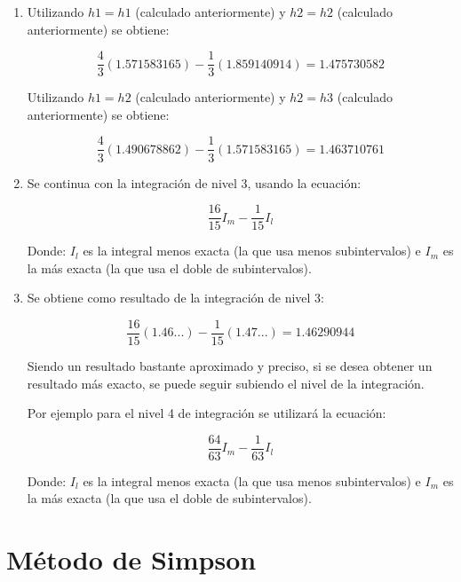 \documentclass[journal,transmag]{IEEEtran}
\theoremstyle{mytheoremstyle}
\theoremstyle{mytheoremstyle}
\theoremstyle{myproblemstyle}
\begin{document}
\begin{enumerate}
    \item   Utilizando $h1 = h1$ (calculado anteriormente) y $h2 = h2$ (calculado anteriormente) se obtiene:
    \begin{center}
    \begin{equation}
        \frac{4}{3}(1.571583165)-\frac{1}{3}(1.859140914) = 1.475730582
    \end{equation}
    \end{center}
    Utilizando $h1 = h2$ (calculado anteriormente) y $h2 = h3$ (calculado anteriormente) se obtiene:
    \begin{center}
    \begin{equation}
        \frac{4}{3}(1.490678862)-\frac{1}{3}(1.571583165) = 1.463710761
    \end{equation}
    \end{center}
    \item   Se continua con la integración de nivel 3, usando la ecuación:
    \begin{center}
    \begin{equation}
        \frac{16}{15}I_m-\frac{1}{15}I_l
    \end{equation}
    \end{center}
    Donde: $I_l$ es la integral menos exacta (la que usa menos subintervalos) e $I_m$ es la más exacta (la que usa el doble de subintervalos).
    \item   Se obtiene como resultado de la integración de nivel 3:
    \begin{center}
    \begin{equation}
        \frac{16}{15}(1.46...)-\frac{1}{15}(1.47...) = 1.46290944
    \end{equation}
    \end{center}
    Siendo un resultado bastante aproximado y preciso, si se desea obtener un resultado más exacto, se puede seguir subiendo el nivel de la integración.

    Por ejemplo para el nivel 4 de integración se utilizará la ecuación:
    \begin{center}
    \begin{equation}
        \frac{64}{63}I_m-\frac{1}{63}I_l
    \end{equation}
    \end{center}
    Donde: $I_l$ es la integral menos exacta (la que usa menos subintervalos) e $I_m$ es la más exacta (la que usa el doble de subintervalos).
    \end{enumerate}
    \section{Método de Simpson}
\end{document}
